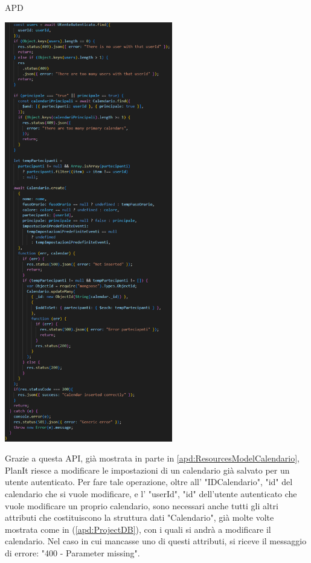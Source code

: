 \begin{listaPersonale} {APD}
\begin{listaPersonale2}[APD]{}
\begin{center}
                \end{center}
                \begin{center}
                    \includegraphics[width=0.55\textwidth, height=0.85\textheight]{img/png/APIs/creaCalendario2.png}
                \end{center}
                \newpage
                Grazie a questa API, già mostrata in parte in \ref{apd:ResourcesModelCalendario}, PlanIt riesce a modificare le impostazioni di un calendario già salvato per un utente autenticato. Per fare tale operazione, oltre all' "IDCalendario", "id" del calendario che si vuole modificare, e l' "userId", "id" dell'utente autenticato che vuole modificare un proprio calendario, sono necessari anche tutti gli altri attributi che costituiscono la struttura dati "Calendario", già molte volte mostrata come in (\ref{apd:ProjectDB}), con i quali si andrà a modificare il calendario. Nel caso in cui mancasse uno di questi attributi, si riceve il messaggio di errore: "400 - Parameter missing". \\

\end{listaPersonale2}
\end{listaPersonale}
